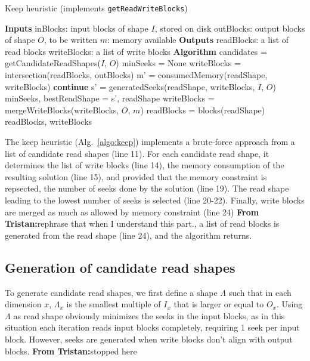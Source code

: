 \documentclass[sigconf, nonacm]{acmart}
\newcommand{\tristan}[1]{\color{orange}\textbf{From Tristan:}#1\color{black}}
\begin{document}
{\begin{algorithm}
  \caption{Keep heuristic (implements \texttt{getReadWriteBlocks})}
  \label{algo:keep}
  \begin{algorithmic}[1]
    \STATE \textbf{Inputs}
    \STATE inBlocks: input blocks of shape $I$, stored on disk
    \STATE outBlocks: output blocks of shape $O$, to be written
    \STATE $m$: memory available
    \STATE
    \STATE \textbf{Outputs}
    \STATE readBlocks: a list of read blocks
    \STATE writeBlocks: a list of write blocks
    \STATE
    \STATE \textbf{Algorithm}
    \STATE candidates = getCandidateReadShapes($I$, $O$)
    \STATE minSeeks = None
      \STATE writeBlocks = intersection(readBlocks, outBlocks)
      \STATE m' = consumedMemory(readShape, writeBlocks)
      \STATE \textbf{continue}
      \ENDIF
      \STATE s' = generatedSeeks(readShape, writeBlocks, $I$, $O$)
      \STATE minSeeks, bestReadShape = s', readShape
      \ENDIF
    \ENDFOR
    \STATE writeBlocks = mergeWriteBlocks(writeBlocks, $O$, $m$)
    \STATE readBlocks = blocks(readShape)
    \RETURN readBlocks, writeBlocks
  \end{algorithmic}
\end{algorithm}
The keep heuristic (Alg.~\ref{algo:keep}) implements a brute-force approach
from a list of candidate read shapes (line 11).  
For each candidate read shape, it determines the list of write blocks (line
14),  
the memory consumption of the resulting solution (line 15), and provided that the
memory constraint is repsected, the number of seeks done by the solution (line
19). The read shape leading to the lowest number of seeks is selected (line
20-22). Finally, write blocks are merged as much as allowed by memory constraint (line 24) \tristan{rephrase that when I understand
this part.}, a list of read blocks is generated from the read shape (line
24), and the algorithm returns.

\subsection{Generation of candidate read shapes}

To generate candidate read shapes, we first define a shape $\Lambda$ such
that in each dimension $x$, $\Lambda_x$ is the smallest multiple of $I_x$
that is larger or equal to $O_x$. Using $\Lambda$ as read shape obviously
minimizes the seeks in the input blocks, as in this situation each
iteration reads input blocks completely, requiring 1 seek per input block.
However, seeks are generated when write blocks don't align with output
blocks. \tristan{stopped here}

}
\end{document}
